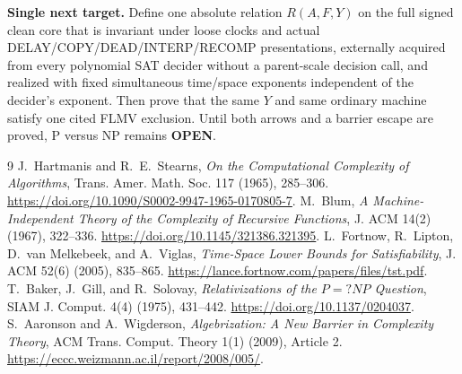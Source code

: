 \documentclass[11pt]{article}
\newcommand{\OPEN}{\textbf{OPEN}}
\begin{document}
\textbf{Single next target.}  Define one absolute relation
$R(A,F,Y)$ on the full signed clean core that is invariant under loose clocks
and actual DELAY/COPY/DEAD/INTERP/RECOMP presentations, externally acquired
from every polynomial SAT decider without a parent-scale decision call, and
realized with fixed simultaneous time/space exponents independent of the
decider's exponent.  Then prove that the same $Y$ and same ordinary machine
satisfy one cited FLMV exclusion.  Until both arrows and a barrier escape are
proved, P versus NP remains \OPEN.

\begin{thebibliography}{9}
 J.~Hartmanis and R.~E.~Stearns,
\emph{On the Computational Complexity of Algorithms}, Trans. Amer. Math.
Soc. 117 (1965), 285--306.
\url{https://doi.org/10.1090/S0002-9947-1965-0170805-7}.
 M.~Blum,
\emph{A Machine-Independent Theory of the Complexity of Recursive Functions},
J. ACM 14(2) (1967), 322--336.
\url{https://doi.org/10.1145/321386.321395}.
 L.~Fortnow, R.~Lipton, D.~van Melkebeek, and A.~Viglas,
\emph{Time-Space Lower Bounds for Satisfiability}, J. ACM 52(6) (2005),
835--865. \url{https://lance.fortnow.com/papers/files/tst.pdf}.
 T.~Baker, J.~Gill, and R.~Solovay,
\emph{Relativizations of the $P=?NP$ Question}, SIAM J. Comput. 4(4)
(1975), 431--442. \url{https://doi.org/10.1137/0204037}.
 S.~Aaronson and A.~Wigderson,
\emph{Algebrization: A New Barrier in Complexity Theory}, ACM Trans.
Comput. Theory 1(1) (2009), Article 2.
\url{https://eccc.weizmann.ac.il/report/2008/005/}.
\end{thebibliography}
\end{document}
